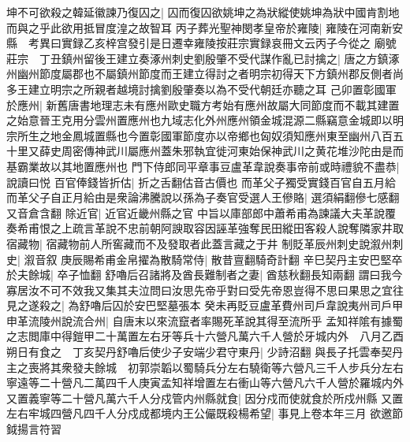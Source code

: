 坤不可欲殺之韓延徽諫乃復囚之|{
	囚而復囚欲姚坤之為狀縱使姚坤為狀中國肯割地而與之乎此欲用抵冒度湟之故智耳}
丙子葬光聖神閔孝皇帝於雍陵|{
	雍陵在河南新安縣　考異曰實録乙亥梓宫發引是日遷幸雍陵按莊宗實録哀冊文云丙子今從之}
廟號莊宗　丁丑鎮州留後王建立奏涿州刺史劉殷肇不受代謀作亂已討擒之|{
	唐之方鎮涿州幽州節度屬郡也不屬鎮州節度而王建立得討之者明宗初得天下方鎮州郡反側者尚多王建立明宗之所親者越境討擒劉殷肇奏以為不受代朝廷亦聽之耳}
己卯置彰國軍於應州|{
	新舊唐書地理志未有應州歐史職方考始有應州故屬大同節度而不載其建置之始意晉王克用分雲州置應州也九域志化外州應州領金城混源二縣竊意金城即以明宗所生之地金鳳城置縣也今置彰國軍節度亦以帝鄉也匈奴須知應州東至幽州八百五十里又薛史周密傳神武川屬應州蓋朱邪執宜徙河東始保神武川之黄花堆沙陀由是而基霸業故以其地置應州也}
門下侍郎同平章事豆盧革韋說奏事帝前或時禮貌不盡恭|{
	說讀曰悦}
百官俸錢皆折估|{
	折之舌翻估音古價也}
而革父子獨受實錢百官自五月給而革父子自正月給由是衆論沸騰說以孫為子奏官受選人王傪賂|{
	選須絹翻傪七感翻又音倉含翻}
除近官|{
	近官近畿州縣之官}
中旨以庫部郎中蕭希甫為諫議大夫革說覆奏希甫恨之上疏言革說不忠前朝阿諛取容因誣革強奪民田縱田客殺人說奪隣家井取宿藏物|{
	宿藏物前人所窖藏而不及發取者此蓋言藏之于井}
制貶革辰州刺史說溆州刺史|{
	溆音叙}
庚辰賜希甫金帛擢為散騎常侍|{
	散昔亶翻騎奇計翻}
辛巳契丹主安巴堅卒於夫餘城|{
	卒子恤翻}
舒嚕后召諸將及酋長難制者之妻|{
	酋慈秋翻長知兩翻}
謂曰我今寡居汝不可不效我又集其夫泣問曰汝思先帝乎對曰受先帝恩豈得不思曰果思之宜往見之遂殺之|{
	為舒嚕后囚於安巴堅墓張本}
癸未再貶豆盧革費州司戶韋說夷州司戶甲申革流陵州說流合州|{
	自唐末以來流竄者率賜死革說其得至流所乎}
孟知祥隂有據蜀之志閲庫中得鎧甲二十萬置左右牙等兵十六營凡萬六千人營於牙城内外　八月乙酉朔日有食之　丁亥契丹舒嚕后使少子安端少君守東丹|{
	少詩沼翻}
與長子托雲奉契丹主之喪將其衆發夫餘城　初郭崇韜以蜀騎兵分左右驍衛等六營凡三千人步兵分左右寧遠等二十營凡二萬四千人庚寅孟知祥增置左右衝山等六營凡六千人營於羅城内外又置義寧等二十營凡萬六千人分戍管内州縣就食|{
	因分戍而使就食於所戍州縣}
又置左右牢城四營凡四千人分戍成都境内王公儼既殺楊希望|{
	事見上卷本年三月}
欲邀節鉞揚言符習

